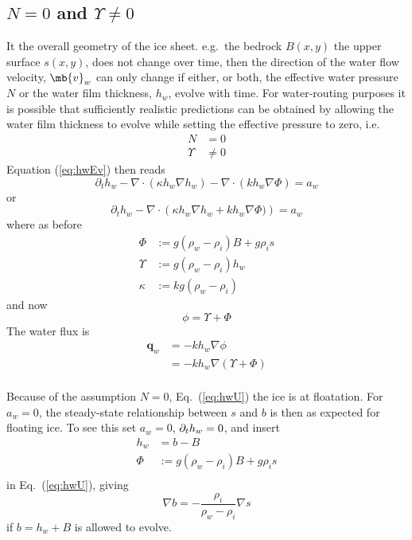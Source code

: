 \documentclass[10pt,a4paper]{article}
\begin{document}
\subsection{$N=0$ and $\Upsilon\neq0$}
It the overall geometry of the ice sheet. e.g.\ the bedrock $B(x,y)$
the upper surface $s(x,y)$, does not change over time, then the
direction of the water flow velocity, $\mb{v}_w$ can only change if
either, or both, the effective water pressure $N$ or the water film
thickness, $h_w$, evolve with time. For water-routing purposes it is
possible that sufficiently realistic predictions can be obtained by
allowing the water film thickness to evolve while setting the
effective pressure to zero, i.e.\
\begin{align*}
  N&=0 \\
  \Upsilon &\neq 0
\end{align*}
Equation (\ref{eq:hwEv}) then reads
\begin{equation}
  \partial_t h_w   - \nabla \cdot ( \kappa h_w \nabla h_w ) - \nabla \cdot (k h_w \nabla \Phi ) = a_w 
\label{eq:hwU}
\end{equation}
or
\begin{equation}
  \partial_t h_w   - \nabla \cdot\left (  \kappa h_w \nabla h_w +  k h_w \nabla \Phi ) \right )  = a_w 
\label{eq:hwD}
\end{equation}
where as before
\begin{align*}
  \Phi&:= g (\rho_w -\rho_i) B + g \rho_i s \\
  \Upsilon&:= g (\rho_w-\rho_i)  h_w  \\
  \kappa&:= k g (\rho_w-\rho_i)
\end{align*}
and now
\[
\phi=\Upsilon +\Phi
\]
The water flux is
\begin{align*}
  \bm{q}_w & = -k h_w \nabla \phi\\
           & = -k h_w \nabla (\Upsilon + \Phi)\\
\end{align*}


Because of the assumption $N=0$, Eq.~(\ref{eq:hwU}) the ice is at
floatation. For $a_w=0$, the steady-state relationship between $s$ and
$b$ is then as expected for floating ice. To see this set $a_w=0$, $\partial_t
h_w=0$, and insert
\begin{align*}
h_w&=b-B \\
\Phi&:= g (\rho_w -\rho_i) B + g \rho_i s \\
\end{align*}
in Eq.~(\ref{eq:hwU}), giving
\[
 \nabla b =  -\frac{\rho_i}{\rho_w-\rho_i} \nabla s 
\]
if $b=h_w+B$ is allowed to evolve.
\end{document}
